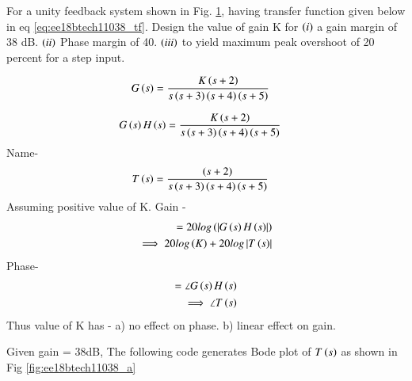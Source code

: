 
\item
For a unity feedback system shown in  Fig.  \ref{fig:ee18btech11038_flow}, having transfer function given below in eq \ref{eq:ee18btech11038_tf}.  Design the value of gain K for $\left(i\right)$ a gain margin of 38 dB. $\left(ii\right)$ Phase margin of 40\degree. $\left(iii\right)$ to yield maximum peak overshoot of 20 percent for a step input.

\begin{figure}[!ht]
	\begin{center}
		
		\resizebox{\columnwidth}{!}{}
	\end{center}
\caption{}
\label{fig:ee18btech11038_flow}
\end{figure}

\begin{align}
\label{eq:ee18btech11038_tf}
G\left(s\right) &= \frac{K\left(s+2\right)}{s\left(s+3\right)\left(s+4\right)\left(s+5\right)}
\end{align}
\solution 

\begin{align}
\label{eq:ee18btech11038_TF(s)}
G\left(s\right)H\left(s\right) &=\frac{K\left(s+2\right)}{s\left(s+3\right)\left(s+4\right)\left(s+5\right)}
\end{align}
Name-
\begin{align}
\label{eq:ee18btech11038_T(s)}
T\left(s\right) &= \frac{\left(s+2\right)}{s\left(s+3\right)\left(s+4\right)\left(s+5\right)}
\end{align}
Assuming positive value of K. Gain -
\begin{align}
\label{eq:ee18btech11038_gain}
      = 20log\left(\left\vert G\left(s\right)H\left(s\right)\right\vert\right)
    \\ \implies 20log\left(K\right) +20log\left\vert T\left(s\right)\right\vert
\end{align}
Phase-
\begin{align}
\label{eq:ee18btech11038_phase}
      = \angle{G\ensuremath{\left(s\right)}H\ensuremath{\left(s\right)}}
    \\ \implies \angle{T\ensuremath{\left(s\right)}}
\end{align}
 Thus value of K has - a) no effect on phase. b) linear effect on gain.




Given gain = 38dB,  The following code generates Bode plot of $T\left(s\right)$ as shown in Fig \ref{fig:ee18btech11038_a}

